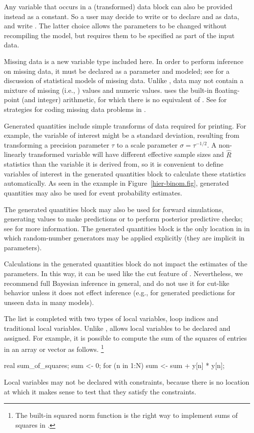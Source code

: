 \documentclass[article]{jss}
\begin{document}
Any variable that occurs in a (transformed) data block can also be
provided instead as a constant.  So a user may decide to write  or to declare  and  as data, and
write .  The latter choice allows the
parameters to be changed without recompiling the model, but requires
them to be specified as part of the input data.

Missing data is a new variable type included here.  In order to
perform inference on missing data, it must be declared as a parameter
and modeled; see \citep{GelmanEtAl:2013} for a discussion of
statistical models of missing data.  Unlike , data may
not contain a mixture of missing (i.e., ) values and numeric
values.   uses the built-in 
floating-point (and integer) arithmetic, for which there is no
equivalent of .  See \citep{Stan:2013} for strategies for
coding missing data problems in .

Generated quantities include simple transforms of data required for
printing.  For example, the variable of interest might be a standard
deviation, resulting from transforming a precision parameter $\tau$ to
a scale parameter $\sigma = \tau^{-1/2}$.  A non-linearly transformed
variable will have different effective sample sizes and $\hat{R}$
statistics than the variable it is derived from, so it is convenient
to define variables of interest in the generated quantities block to
calculate these statistics automatically.  As seen in the example in
Figure~\ref{hier-binom.fig}, generated quantities may also be used for
event probability estimates.

The generated quantities block may also be used for forward
simulations, generating values to make predictions or to perform
posterior predictive checks; see \citep{GelmanEtAl:2013} for more
information.  The generated quantities block is the only location in
 in which random-number generators may be applied
explicitly (they are implicit in parameters).

Calculations in the generated quantities block do not impact the
estimates of the parameters.  In this way, it can be used like the cut
feature of .  Nevertheless, we recommend full Bayesian
inference in general, and do not use it for cut-like behavior unless
it does not effect inference (e.g., for generated predictions for
unseen data in many models).

The list is completed with two types of local variables, loop indices
and traditional local variables.  Unlike ,
 allows local variables to be declared and assigned.
For example, it is possible to compute the sum of the squares of
entries in an array or vector  as follows.%
%
\footnote{The built-in squared norm function is the right way to
  implement sums of squares in .}
%
\begin{Code}
{ 
  real sum_of_squares;
  sum <- 0;
  for (n in 1:N)
    sum <- sum + y[n] * y[n];
}  
\end{Code}
%
Local variables may not be declared with constraints, because there is
no location at which it makes sense to test that they satisfy the
constraints. 
\end{document}
